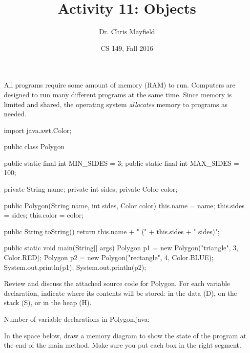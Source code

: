 \documentclass[12pt]{article}
\title{Activity 11: Objects}
\author{Dr. Chris Mayfield}
\date{CS 149, Fall 2016}
\begin{document}
\maketitle

All programs require some amount of memory (RAM) to run.
Computers are designed to run many different programs at the same time.
Since memory is limited and shared, the operating system \emph{allocates} memory to programs as needed.







\begin{javalst}
import java.awt.Color;

public class Polygon {
    
    public static final int MIN_SIDES = 3;
    public static final int MAX_SIDES = 100;
    
    private String name;
    private int sides;
    private Color color;
    
    public Polygon(String name, int sides, Color color) {
        this.name = name;
        this.sides = sides;
        this.color = color;
    }
    
    public String toString() {
        return this.name + " (" + this.sides + " sides)";
    }
    
    public static void main(String[] args) {
        Polygon p1 = new Polygon("triangle", 3, Color.RED);
        Polygon p2 = new Polygon("rectangle", 4, Color.BLUE);
        System.out.println(p1);
        System.out.println(p2);
    }
    
}
\end{javalst}


\Q Review and discuss the attached source code for Polygon.
For each variable declaration, indicate where its contents will be stored: in the data (D), on the stack (S), or in the heap (H).

\begin{center}
Number of variable declarations in Polygon.java: \blank
\end{center}

\Q In the space below, draw a memory diagram to show the state of the  program at the end of the main method.
Make sure you put each box in the right segment.
\end{document}
